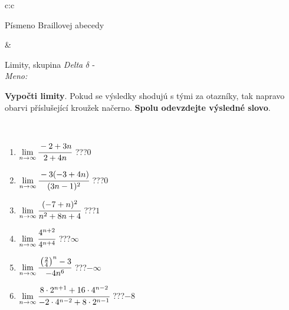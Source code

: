 \documentclass[10pt]{report}
\begin{document}
\begin{tabular}{c:c}
\begin{minipage}[c][104.5mm][t]{0.5\linewidth}
\begin{center}
\begin{minipage}{0.20\linewidth}
\begin{center}
{\small Písmeno Braillovej abecedy}
\end{center}
\end{minipage}
\end{center}
\end{minipage}
&
\begin{minipage}[c][104.5mm][t]{0.5\linewidth}
\begin{center}
\vspace{7mm}
{\huge Limity, skupina \textit{Delta $\delta$} -}\\[5mm]
\textit{Meno:}\phantom{xxxxxxxxxxxxxxxxxxxxxxxxxxxxxxxxxxxxxxxxxxxxxxxxxxxxxxxxxxxxxxxxx}\\[5mm]
\begin{minipage}{0.95\linewidth}
\begin{center}
\textbf{Vypočti limity}. Pokud se výsledky shodujú s tými za otazníky, tak napravo\\obarvi příslušející kroužek načerno. \textbf{Spolu odevzdejte výsledné slovo}.
\end{center}
\end{minipage}
\\[1mm]
\begin{minipage}{0.79\linewidth}
\begin{center}
\begin{varwidth}{\linewidth}
\begin{enumerate}
\normalsize
\item $\lim\limits_{n\to\infty}\cfrac{-2+3n}{2+4n}$\quad \dotfill\; ???\;\dotfill \quad $0$
\item $\lim\limits_{n\to\infty}\cfrac{-3(-3+4n)}{(3n-1)^2}$\quad \dotfill\; ???\;\dotfill \quad $0$
\item $\lim\limits_{n\to\infty}\cfrac{(-7+n)^2}{n^2+8n+4}$\quad \dotfill\; ???\;\dotfill \quad $1$
\item $\lim\limits_{n\to\infty}\cfrac{4^{n+2}}{4^{n+4}}$\quad \dotfill\; ???\;\dotfill \quad $\infty$
\item $\lim\limits_{n\to\infty}\cfrac{\left(\frac{2}{4}\right)^n -3}{-4n^{6}}$\quad \dotfill\; ???\;\dotfill \quad $-\infty$
\item $\lim\limits_{n\to\infty}\cfrac{8\cdot 2^{n+1}+16\cdot 4^{n-2}}{-2\cdot 4^{n-2}+8\cdot 2^{n-1}}$\quad \dotfill\; ???\;\dotfill \quad $-8$
\end{enumerate}
\end{varwidth}
\end{center}
\end{minipage}
\begin{minipage}{0.20\linewidth}

\end{minipage}
\end{center}
\end{minipage}
\end{tabular}
\end{document}
